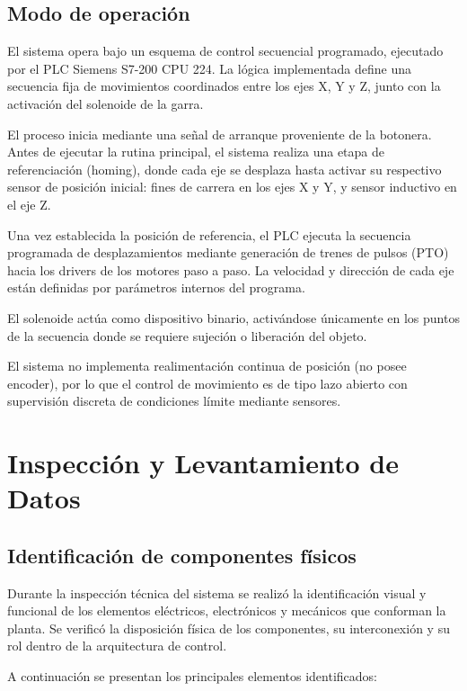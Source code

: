\documentclass[a4paper,12pt]{article}
\begin{document}
\subsection{Modo de operación}
El sistema opera bajo un esquema de control secuencial programado, ejecutado por el PLC Siemens S7-200 CPU 224. La lógica implementada define una secuencia fija de movimientos coordinados entre los ejes X, Y y Z, junto con la activación del solenoide de la garra.

El proceso inicia mediante una señal de arranque proveniente de la botonera. Antes de ejecutar la rutina principal, el sistema realiza una etapa de referenciación (homing), donde cada eje se desplaza hasta activar su respectivo sensor de posición inicial: fines de carrera en los ejes X y Y, y sensor inductivo en el eje Z.

Una vez establecida la posición de referencia, el PLC ejecuta la secuencia programada de desplazamientos mediante generación de trenes de pulsos (PTO) hacia los drivers de los motores paso a paso. La velocidad y dirección de cada eje están definidas por parámetros internos del programa.

El solenoide actúa como dispositivo binario, activándose únicamente en los puntos de la secuencia donde se requiere sujeción o liberación del objeto.

El sistema no implementa realimentación continua de posición (no posee encoder), por lo que el control de movimiento es de tipo lazo abierto con supervisión discreta de condiciones límite mediante sensores.

\section{Inspección y Levantamiento de Datos}

\subsection{Identificación de componentes físicos}

Durante la inspección técnica del sistema se realizó la identificación visual y funcional de los elementos eléctricos, electrónicos y mecánicos que conforman la planta. Se verificó la disposición física de los componentes, su interconexión y su rol dentro de la arquitectura de control.

A continuación se presentan los principales elementos identificados:
\end{document}
